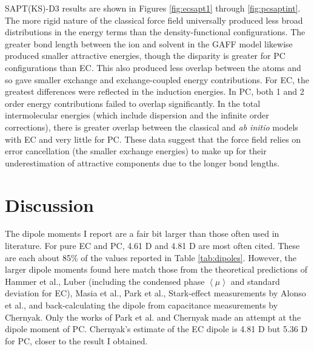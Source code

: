 \begin{ecpc}
   SAPT(KS)-D3 results are shown in Figures \ref{fig:ecsapt1} through \ref{fig:pcsaptint}. The more rigid nature of the classical force field universally produced
   less broad distributions in the energy terms than the density-functional configurations. The greater bond length between the ion and solvent in the GAFF model
   likewise produced smaller attractive energies, though the disparity is greater for PC configurations than EC. This also produced less overlap between the atoms
   and so gave smaller exchange and exchange-coupled energy contributions. For EC, the greatest differences were reflected in the induction energies. In PC, both
   1 and 2 order energy contributions failed to overlap significantly. In the total intermolecular energies (which include dispersion and the infinite
   order corrections), there is greater overlap between the classical and \emph{ab initio} models with EC and very little for PC. These data suggest that the force 
   field relies on error cancellation (the smaller exchange energies) to make up for their underestimation of attractive components due to the longer bond lengths.

  \section{\label{ch4:sec3:level1}Discussion}
   The dipole moments I report are a fair bit larger than those often used in literature. For pure EC and PC, 4.61 D and 4.81 D are most often cited\cite{ayse2016ecpc,peruzzi2015solvation}.
   These are each about 85\% of the values reported in Table \ref{tab:dipoles}. However, the larger dipole moments found here match those from the theoretical predictions of Hammer et 
   al.\cite{hammer2004dipole}, Luber\cite{luber2014local} (including the condensed phase $\left<\mu\right>$ and standard deviation for EC), Masia et al.\cite{masia2004ethylene}, Park et 
   al.\cite{park2011low}, Stark-effect measurements by Alonso et al.\cite{alonso1986microwave}, and back-calculating the dipole from capacitance measurements by Chernyak\cite{chernyak2006dielectric}. 
   Only the works of Park et al. and Chernyak made an attempt at the dipole moment of PC. Chernyak's estimate of the EC dipole is 4.81 D but 5.36 D for PC, closer to the result I 
   obtained\cite{chernyak2006dielectric}.
   

\end{ecpc}
